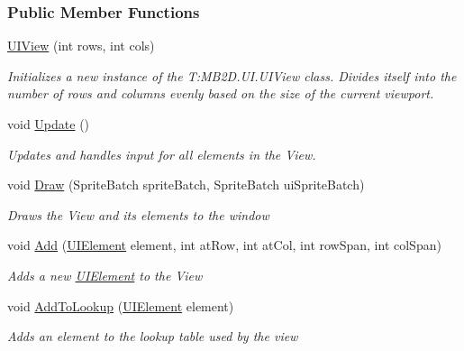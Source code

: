 \subsubsection*{Public Member Functions}
\begin{DoxyCompactItemize}
\item 
\hyperlink{class_m_b2_d_1_1_u_i_1_1_u_i_view_ad441dede0fc04e04b4137395eaeab376}{U\+I\+View} (int rows, int cols)
\begin{DoxyCompactList}\small\item\em Initializes a new instance of the T\+:\+M\+B2\+D.\+U\+I.\+U\+I\+View class. Divides itself into the number of rows and columns evenly based on the size of the current viewport. \end{DoxyCompactList}\item 
void \hyperlink{class_m_b2_d_1_1_u_i_1_1_u_i_view_a5628b6cd853a0f419eb8ac62958f62bb}{Update} ()
\begin{DoxyCompactList}\small\item\em Updates and handles input for all elements in the View. \end{DoxyCompactList}\item 
void \hyperlink{class_m_b2_d_1_1_u_i_1_1_u_i_view_a1f1acf013f17aa0738ff2d9b0516126e}{Draw} (Sprite\+Batch sprite\+Batch, Sprite\+Batch ui\+Sprite\+Batch)
\begin{DoxyCompactList}\small\item\em Draws the View and its elements to the window \end{DoxyCompactList}\item 
void \hyperlink{class_m_b2_d_1_1_u_i_1_1_u_i_view_a486357124c0a1bc13d1c5909f26a6e2b}{Add} (\hyperlink{class_m_b2_d_1_1_u_i_1_1_u_i_element}{U\+I\+Element} element, int at\+Row, int at\+Col, int row\+Span, int col\+Span)
\begin{DoxyCompactList}\small\item\em Adds a new \hyperlink{class_m_b2_d_1_1_u_i_1_1_u_i_element}{U\+I\+Element} to the View \end{DoxyCompactList}\item 
void \hyperlink{class_m_b2_d_1_1_u_i_1_1_u_i_view_aad1fdbf0c8a8d94cb57fff8b5ff43ec8}{Add\+To\+Lookup} (\hyperlink{class_m_b2_d_1_1_u_i_1_1_u_i_element}{U\+I\+Element} element)
\begin{DoxyCompactList}\small\item\em Adds an element to the lookup table used by the view \end{DoxyCompactList}\end{DoxyCompactItemize}
